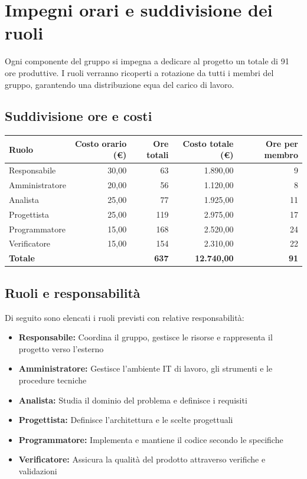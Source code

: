 \documentclass[italian, 12pt]{article}
\begin{document}
\section{Impegni orari e suddivisione dei ruoli}
Ogni componente del gruppo si impegna a dedicare al progetto un totale di 91 ore produttive. I ruoli verranno ricoperti a rotazione da tutti i membri del gruppo, garantendo una distribuzione equa del carico di lavoro.



\subsection{Suddivisione ore e costi}
\begin{table}[h]
\centering
\begin{tabular}{lrrrr}
\toprule
\textbf{Ruolo} & \textbf{Costo orario (€)} & \textbf{Ore totali} & \textbf{Costo totale (€)} & \textbf{Ore per membro} \\
\midrule
Responsabile & 30,00 & 63 & 1.890,00 & 9 \\
Amministratore & 20,00 & 56 & 1.120,00 & 8 \\
Analista & 25,00 & 77 & 1.925,00 & 11 \\
Progettista & 25,00 & 119 & 2.975,00 & 17 \\
Programmatore & 15,00 & 168 & 2.520,00 & 24 \\
Verificatore & 15,00 & 154 & 2.310,00 & 22 \\
\midrule
\textbf{Totale} & & \textbf{637} & \textbf{12.740,00} & \textbf{91} \\
\bottomrule
\end{tabular}
\end{table}

\subsection{Ruoli e responsabilità}
Di seguito sono elencati i ruoli previsti con relative responsabilità:
\begin{itemize}
    \item \textbf{Responsabile:} Coordina il gruppo, gestisce le risorse e rappresenta il progetto verso l'esterno
    \item \textbf{Amministratore:} Gestisce l'ambiente IT di lavoro, gli strumenti e le procedure tecniche
    \item \textbf{Analista:} Studia il dominio del problema e definisce i requisiti
    \item \textbf{Progettista:} Definisce l'architettura e le scelte progettuali
    \item \textbf{Programmatore:} Implementa e mantiene il codice secondo le specifiche
    \item \textbf{Verificatore:} Assicura la qualità del prodotto attraverso verifiche e validazioni
\end{itemize}
\end{document}
